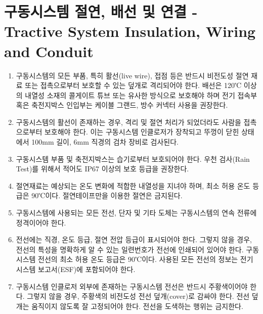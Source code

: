 \documentclass[final,a4paper,10pt]{report}
\begin{document}
\section{구동시스템 절연, 배선 및 연결 - Tractive System Insulation, Wiring and Conduit}\label{rule:formula-technical.tractive-system-wiring}
\begin{enumerate}
  \item\label{rule:formula-technical.tractive-system-wiring.live-parts-insulated-cover} 구동시스템의 모든 부품, 특히 활선(live wire), 접점 등은 반드시 비전도성 절연 재료 또는 접촉으로부터 보호할 수 있는 덮개로 격리되어야 한다. 배선은 120℃ 이상의 내열성 소재의 콜게이트 튜브 또는 유사한 방식으로 보호해야 하며 전기 접속부 혹은 축전지박스 인입부는 케이블 그랜드, 방수 커넥터 사용을 권장한다.
  \item\label{rule:formula-technical.tractive-system-wiring.probe-test-100x6mm} {\color{blue}구동시스템의 활선이 존재하는 경우, 격리 및 절연 처리가 되었더라도 사람을 접촉으로부터 보호해야 한다. 이는 구동시스템 인클로저가 장착되고 뚜껑이 닫힌 상태에서 100mm 길이, 6mm 직경의 검차 장비로 검사된다.}
  \item\label{rule:formula-technical.tractive-system-wiring.moisture-protection-ip67} 구동시스템 부품 및 축전지박스는 습기로부터 보호되어야 한다. 우천 검사(Rain Test)를 위해서 적어도 IP67 이상의 보호 등급을 권장한다.
  \item\label{rule:formula-technical.tractive-system-wiring.tape-alone-insufficient} 절연재료는 예상되는 온도 변화에 적합한 내열성을 지녀야 하며, 최소 허용 온도 등급은 90℃이다. 절연테이프만을 이용한 절연은 금지된다.
  \item\label{rule:formula-technical.tractive-system-wiring.rated-for-continuous-current} 구동시스템에 사용되는 모든 전선, 단자 및 기타 도체는 구동시스템의 연속 전류에 정격이어야 한다.
  \item\label{rule:formula-technical.tractive-system-wiring.wire-marking-and-rating} 전선에는 직경, 온도 등급, 절연 전압 등급이 표시되어야 한다. 그렇지 않을 경우, 전선의 특성을 명확하게 알 수 있는 일련번호가 전선에 인쇄되어 있어야 한다. 구동시스템 전선의 최소 허용 온도 등급은 90℃이다. 사용된 모든 전선의 정보는 전기시스템 보고서(ESF)에 포함되어야 한다.
  \item\label{rule:formula-technical.tractive-system-wiring.orange-wire-or-cover} {\color{blue}구동시스템} 인클로저 외부에 존재하는 구동시스템 전선은 반드시 주황색이어야 한다. 그렇지 않을 경우, 주황색의 비전도성 전선 덮개(cover)로 감싸야 한다. 전선 덮개는 움직이지 않도록 잘 고정되어야 한다. 전선을 도색하는 행위는 금지한다.

\end{enumerate}
\end{document}
